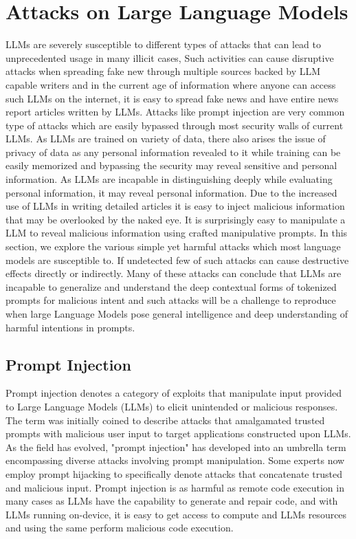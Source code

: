\documentclass[pdflatex,sn-mathphys-num]{sn-jnl}%
\theoremstyle{thmstyleone}%
\theoremstyle{thmstyletwo}%
\theoremstyle{thmstylethree}%
\begin{document}
\section{Attacks on Large Language Models}\label{sec4}
LLMs are severely susceptible to different types of  attacks that can lead to unprecedented usage in many illicit cases, Such activities can cause disruptive attacks when spreading fake new through multiple sources backed by LLM capable writers and in the current age of information where anyone can access such LLMs on the internet, it is easy to spread fake news and have entire news report articles written by LLMs. Attacks like prompt injection are very common type of attacks which are easily bypassed through most security walls of current LLMs. As LLMs are trained on variety of data, there also arises the issue of privacy of data as any personal information revealed to it while training can be easily memorized and bypassing the security may reveal sensitive and personal information\cite{bib7}. As LLMs are incapable in distinguishing deeply while evaluating personal information, it may reveal personal information. Due to the increased use of LLMs in writing detailed articles it is easy to inject malicious information that may be overlooked by the naked eye. It is surprisingly easy to manipulate a LLM to reveal malicious information using crafted manipulative prompts\cite{bib8}. In this section, we explore the various simple yet harmful attacks which most language models are susceptible to. If undetected few of such attacks can cause destructive effects directly or indirectly. Many of these attacks can conclude that LLMs are incapable to generalize and understand the deep contextual forms of tokenized prompts for malicious intent and such attacks will be a challenge to reproduce when large Language Models pose general intelligence and deep understanding of harmful intentions in prompts.

\subsection{Prompt Injection}\label{subsec2}
Prompt injection denotes a category of exploits that manipulate input provided to Large Language Models (LLMs) to elicit unintended or malicious responses. The term was initially coined to describe attacks that amalgamated trusted prompts with malicious user input to target applications constructed upon LLMs. As the field has evolved, "prompt injection" has developed into an umbrella term encompassing diverse attacks involving prompt manipulation. Some experts now employ prompt hijacking to specifically denote attacks that concatenate trusted and malicious input. Prompt injection is as harmful as remote code execution in many cases as LLMs have the capability to generate and repair code, and with LLMs running on-device\cite{zhang2024enabling}, it is easy to get access to compute and LLMs resources and using the same perform malicious code execution. 
\end{document}
